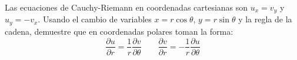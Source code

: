 Las ecuaciones de Cauchy-Riemann en coordenadas cartesianas son $u_x = v_y$ y $u_y = -v_x$. Usando el cambio de variables $x = r\cos\theta$, $y = r\sin\theta$ y la regla de la cadena, demuestre que en coordenadas polares toman la forma:
\[
\frac{\partial u}{\partial r} = \frac{1}{r}\frac{\partial v}{\partial \theta}
\qquad
\frac{\partial v}{\partial r} = -\frac{1}{r}\frac{\partial u}{\partial \theta}
\]
